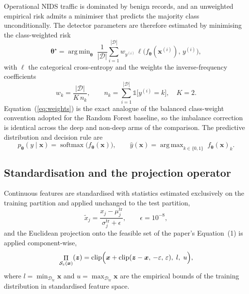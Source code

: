 \documentclass[11pt,a4paper]{article}
\newcommand{\Ind}{\mathbb{1}}
\newcommand{\vx}{\bm{x}}
\newcommand{\vz}{\bm{z}}
\newcommand{\vtheta}{\bm{\theta}}
\newcommand{\Dset}{\mathcal{D}}
\newcommand{\Sset}{\mathcal{S}}
\DeclareMathOperator*{\argmin}{arg\,min}
\DeclareMathOperator*{\argmax}{arg\,max}
\DeclareMathOperator{\softmax}{softmax}
\DeclareMathOperator{\clip}{clip}
\DeclareMathOperator{\Proj}{\Pi}
\begin{document}
Operational NIDS traffic is dominated by benign records, and an
unweighted empirical risk admits a minimiser that predicts the majority
class unconditionally. The detector parameters are therefore estimated
by minimising the class-weighted risk
\begin{equation}
\vtheta^{\star}
=\argmin_{\vtheta}\;
\frac{1}{|\Dset|}\sum_{i=1}^{|\Dset|} w_{y^{(i)}}\,
\ell\bigl(f_{\vtheta}(\vx^{(i)}),\,y^{(i)}\bigr),
\label{eq:erm}
\end{equation}
with $\ell$ the categorical cross-entropy and the weights the
inverse-frequency coefficients
\begin{equation}
w_{k}=\frac{|\Dset|}{K\,n_{k}},\qquad
n_{k}=\sum_{i=1}^{|\Dset|}\Ind\bigl[y^{(i)}=k\bigr],\quad K=2 .
\label{eq:weights}
\end{equation}
Equation~(\ref{eq:weights}) is the exact analogue of the balanced
class-weight convention adopted for the Random Forest baseline, so the
imbalance correction is identical across the deep and non-deep arms of
the comparison. The predictive distribution and decision rule are
\begin{equation}
p_{\vtheta}(y\mid\vx)=\softmax\bigl(f_{\vtheta}(\vx)\bigr),
\qquad
\hat{y}(\vx)=\argmax_{k\in\{0,1\}} \; f_{\vtheta}(\vx)_{k}.
\label{eq:decision}
\end{equation}

\subsection{Standardisation and the projection operator}

Continuous features are standardised with statistics estimated
exclusively on the training partition and applied unchanged to the test
partition,
\begin{equation}
\tilde{x}_{j}=\frac{x_{j}-\mu_{j}^{\mathrm{tr}}}
{\sigma_{j}^{\mathrm{tr}}+\epsilon},\qquad \epsilon=10^{-8},
\label{eq:standardise}
\end{equation}
and the Euclidean projection onto the feasible set of the paper's
Equation~(1) is applied component-wise,
\begin{equation}
\Proj_{\Sset_{\varepsilon}(\vx)}(\vz)=
\clip\Bigl(\vx+\clip(\vz-\vx,\,-\varepsilon,\,\varepsilon),\;l,\;u\Bigr),
\label{eq:proj}
\end{equation}
where $l=\min_{\Dset_{\mathrm{tr}}}\vx$ and
$u=\max_{\Dset_{\mathrm{tr}}}\vx$ are the empirical bounds of the
training distribution in standardised feature space.
\end{document}
